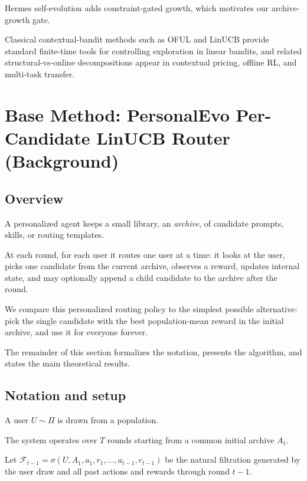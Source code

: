 \documentclass{article} %
\begin{document}
Hermes self-evolution \citep{hermes_selfevolution,hermes_agent} adds constraint-gated growth, which motivates our archive-growth gate.

Classical contextual-bandit methods such as OFUL and LinUCB \citep{abbasi2011oful,chu2011linucb,li2010contextual} provide standard finite-time tools for controlling exploration in linear bandits, and related structural-vs-online decompositions appear in contextual pricing, offline RL, and multi-task transfer.

\section{Base Method: PersonalEvo Per-Candidate LinUCB Router (Background)}
\label{sec:background}

\label{sec:method}

\subsection{Overview}

\label{sec:method-plain}

A personalized agent keeps a small library, an \emph{archive}, of candidate prompts, skills, or routing templates.

At each round, for each user it routes one user at a time: it looks at the user, picks one candidate from the current archive, observes a reward, updates internal state, and may optionally append a child candidate to the archive after the round.

We compare this personalized routing policy to the simplest possible alternative: pick the single candidate with the best population-mean reward in the initial archive, and use it for everyone forever.

The remainder of this section formalizes the notation, presents the algorithm, and states the main theoretical results.

\subsection{Notation and setup}

\label{sec:method-notation}

A user $U \sim \Pi$ is drawn from a population.

The system operates over $T$ rounds starting from a common initial archive $A_1$.

Let $\mathcal{F}_{t-1} = \sigma(U, A_1, a_1, r_1, \ldots, a_{t-1}, r_{t-1})$ be the natural filtration generated by the user draw and all past actions and rewards through round $t-1$.
\end{document}
